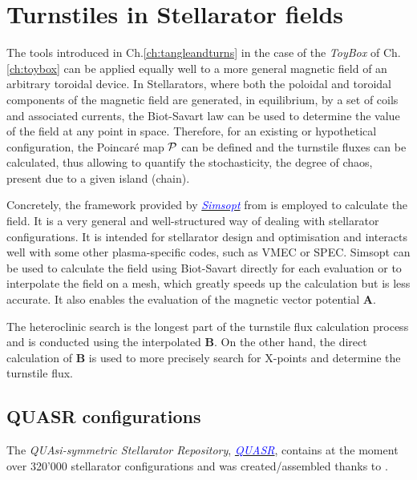 

\chapter{Turnstiles in Stellarator fields}

The tools introduced in Ch.\ref{ch:tangleandturns} in the case of the \textit{ToyBox} of Ch.\ref{ch:toybox} can be applied equally well to a more general magnetic field of an arbitrary toroidal device. In Stellarators, where both the poloidal and toroidal components of the magnetic field are generated, in equilibrium, by a set of coils and associated currents, the Biot-Savart law can be used to determine the value of the field at any point in space. Therefore, for an existing or hypothetical configuration, the Poincaré map $\mathcal{P}$ can be defined and the turnstile fluxes can be calculated, thus allowing to quantify the stochasticity, the degree of chaos, present due to a given island (chain).

Concretely, the framework provided by 
\href{https://simsopt.readthedocs.io/en/latest}{\textcolor{blue}{\textit{Simsopt}}} from \citeauthor{medasani_hiddensymmetriessimsopt_2024} is employed to calculate the field. It is a very general and well-structured way of dealing with stellarator configurations. It is intended for stellarator design and optimisation and interacts well with some other plasma-specific codes, such as VMEC or SPEC. Simsopt can be used to calculate the field using Biot-Savart directly for each evaluation or to interpolate the field on a mesh, which greatly speeds up the calculation but is less accurate. It also enables the evaluation of the magnetic vector potential $\textbf{A}$.

The heteroclinic search is the longest part of the turnstile flux calculation process and is conducted using the interpolated $\textbf{B}$. On the other hand, the direct calculation of $\textbf{B}$ is used to more precisely search for X-points and determine the turnstile flux.

\section{QUASR configurations}

The \textit{QUAsi-symmetric Stellarator Repository}, \href{https://quasr.flatironinstitute.org/}{\textcolor{blue}{\textit{QUASR}}}, contains at the moment over 320'000 stellarator configurations and was created/assembled thanks to \cite{noauthor_quasr_nodate}.

